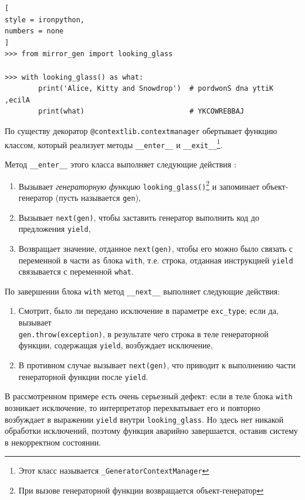 \documentclass[%
	11pt,
	a4paper,
	utf8,
		]{article}
\begin{document}
\begin{lstlisting}[
style = ironpython,
numbers = none
]
>>> from mirror_gen import looking_glass

>>> with looking_glass() as what:
        print('Alice, Kitty and Snowdrop')  # pordwonS dna yttiK ,ecilA
        print(what)                         # YKCOWREBBAJ
\end{lstlisting}

По существу декоратор \texttt{@contextlib.contextmanager} обертывает функцию классом, который реализует методы \texttt{\_\_enter\_\_} и \texttt{\_\_exit\_\_}\footnote{Этот класс называется \texttt{\_GeneratorContextManager}}.

Метод \texttt{\_\_enter\_\_} этого класса выполняет следующие действия \cite[]{ramalho:python-2016}:

\begin{enumerate}
	\item Вызывает \emph{генераторную функцию} \texttt{looking\_glass()}\footnote{При вызове генераторной функции возвращается объект-генератор} и запоминает объект-генератор (пусть называется \texttt{gen}),
	
	\item Вызывает \texttt{next(gen)}, чтобы заставить генератор выполнить код до предложения \texttt{yield},
	
	\item Возвращает значение, отданное \texttt{next(gen)}, чтобы его можно было связать с переменной в части \texttt{as} блока \texttt{with}, т.е. строка, отданная инструкцией \texttt{yield} связывается с переменной \texttt{what}.
\end{enumerate}

По завершении блока \texttt{with} метод \texttt{\_\_next\_\_} выполняет следующие действия:

\begin{enumerate}
	\item Смотрит, было ли передано исключение в параметре \texttt{exc\_type}; если да, вызывает \\ \texttt{gen.throw(exception)}, в результате чего строка в теле генераторной функции, содержащая \texttt{yield}, возбуждает исключение,
	
	\item В противном случае вызывает \texttt{next(gen)}, что приводит к выполнению части генераторной функции после \texttt{yield}.
\end{enumerate}

В рассмотренном примере есть очень серьезный дефект: если в теле блока \texttt{with} возникает исключение, то интерпретатор перехватывает его и повторно возбуждает в выражении \texttt{yield} внутри \texttt{looking\_glass}. Но здесь нет никакой обработки исключений, поэтому функция аварийно завершается, оставив систему в некорректном состоянии.
\end{document}
